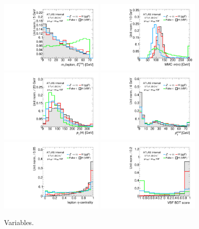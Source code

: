 \begin{figure}[tp]
  \centering
  \includegraphics[width=0.45\textwidth]{figures/overlaid/vbf/mT}
  \includegraphics[width=0.45\textwidth]{figures/overlaid/vbf/mMMC}
  \includegraphics[width=0.45\textwidth]{figures/overlaid/vbf/H-pt-hi}
  \includegraphics[width=0.45\textwidth]{figures/overlaid/vbf/system-pt}
  \includegraphics[width=0.45\textwidth]{figures/overlaid/vbf/lep-eta-centrality}
  \includegraphics[width=0.45\textwidth]{figures/overlaid/vbf/BDTEve-VBF}
  \caption{Variables.}
  \label{fig:strategy-overlaid-vbf-other}
\end{figure}
